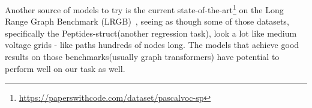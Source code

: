 Another source of models to try is the current
state-of-the-art\footnote{\url{https://paperswithcode.com/dataset/pascalvoc-sp}} on the
Long Range Graph Benchmark (LRGB)~\cite{dwivedi2022long}, seeing as though some of those
datasets, specifically the Peptides-struct(another regression task), look a lot like
medium voltage grids - like paths hundreds of nodes long.
The models that achieve good results on those benchmarks(usually graph transformers)
have potential to perform well on our task as well.